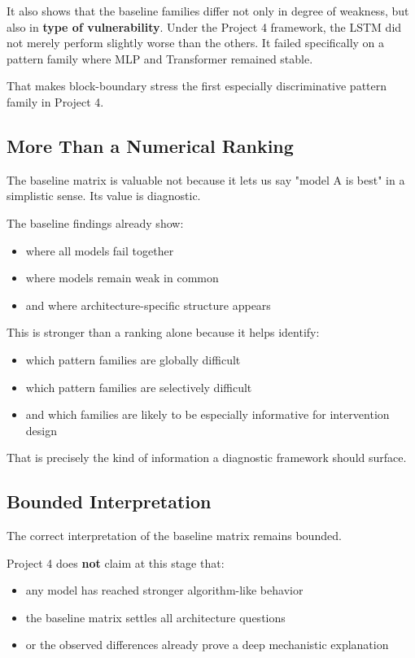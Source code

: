 \documentclass[11pt]{article}
\begin{document}
It also shows that the baseline families differ not only in degree of weakness, but also in \textbf{type of vulnerability}. Under the Project 4 framework, the LSTM did not merely perform slightly worse than the others. It failed specifically on a pattern family where MLP and Transformer remained stable.

That makes block-boundary stress the first especially discriminative pattern family in Project 4.

\subsection{More Than a Numerical Ranking}

The baseline matrix is valuable not because it lets us say "model A is best" in a simplistic sense. Its value is diagnostic.

The baseline findings already show:
\begin{itemize}[leftmargin=1.5em]
    \item where all models fail together
    \item where models remain weak in common
    \item and where architecture-specific structure appears
\end{itemize}

This is stronger than a ranking alone because it helps identify:
\begin{itemize}[leftmargin=1.5em]
    \item which pattern families are globally difficult
    \item which pattern families are selectively difficult
    \item and which families are likely to be especially informative for intervention design
\end{itemize}

That is precisely the kind of information a diagnostic framework should surface.

\subsection{Bounded Interpretation}

The correct interpretation of the baseline matrix remains bounded.

Project 4 does \textbf{not} claim at this stage that:
\begin{itemize}[leftmargin=1.5em]
    \item any model has reached stronger algorithm-like behavior
    \item the baseline matrix settles all architecture questions
    \item or the observed differences already prove a deep mechanistic explanation
\end{itemize}
\end{document}
